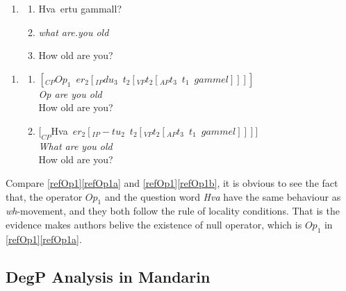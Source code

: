 \documentclass{ctexart}
\begin{document}
\begin{enumerate}[resume]
\item \label{refHva}
\begin{enumerate}
\item Hva\dh$\enspace$ertu gammall? 
\item \textit{what are.you old}
\item How old are you?
\end{enumerate}
\end{enumerate}

\begin{enumerate}[resume]
\item \label{refOp1}
\begin{enumerate}
\item \label{refOp1a} $[_{CP}Op_1 \enspace er_2[_{IP} du_3 \enspace t_2 [_{VP} t_2[_{AP} t_3 \enspace t_1 \enspace gammel]]]]$ \\
\textit{Op are you old} \\
How old are you?
\item \label{refOp1b} $[_{CP}$Hva\dh$\enspace er_2[_{IP} -tu_2 \enspace t_2 [_{VP} t_2[_{AP} t_3 \enspace t_1 \enspace gammel]]]]$ \\
\textit{What are you old} \\
How old are you?
\end{enumerate}
\end{enumerate}

Compare \ref{refOp1}\ref{refOp1a} and \ref{refOp1}\ref{refOp1b}, it is obvious to see the fact that, the operator $Op_1$ and the question word \textit{Hva\dh} \enspace have the same behaviour as \textit{wh}-movement, and they both follow the rule of locality conditions. That is the evidence makes authors belive the existence of null operator, which is $Op_1$ in \ref{refOp1}\ref{refOp1a}.


\subsection{DegP Analysis in Mandarin}


\end{document}
